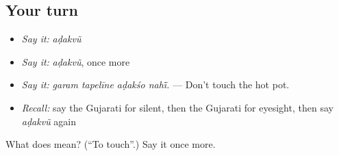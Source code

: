 \subsection*{Your turn}
\begin{itemize}
\raggedright
  \item \emph{Say it:} \emph{aḍakvũ}
  \item \emph{Say it:} \emph{aḍakvũ}, once more
  \item \emph{Say it:} \emph{garam tapelīne aḍakśo nahī̃.} — Don't touch the hot pot.
  \item \emph{Recall:} say the Gujarati for silent, then the Gujarati for eyesight, then say \emph{aḍakvũ} again
\end{itemize}

\begin{tcolorbox}[breakable,colback=teal!4,colframe=teal!35!black,title={Before you move on}]
What does  mean? (\textquotedblleft{}To touch\textquotedblright{}.) Say it once more.
\end{tcolorbox}
